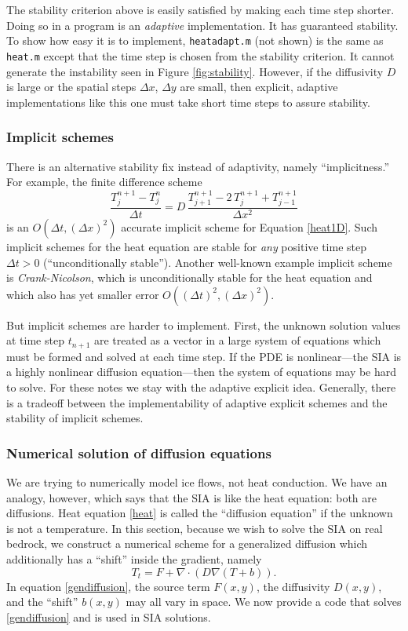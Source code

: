 \documentclass[titlepage,a4paper,final,12pt]{scrartcl}
\newcommand{\grad}{\nabla}
\newcommand{\Div}{\nabla\cdot}
\begin{document}
The stability criterion above is easily satisfied by making each time step shorter.  Doing so in a program is an \emph{adaptive} implementation.  It has guaranteed stability.  To show how easy it is to implement, \texttt{heatadapt.m} (not shown) is the same as \texttt{heat.m} except that the time step is chosen from the stability criterion.  It cannot generate the instability seen in Figure \ref{fig:stability}.  However, if the diffusivity $D$ is large or the spatial steps $\Delta x$, $\Delta y$ are small, then explicit, adaptive implementations like this one must take short time steps to assure stability.


\subsubsection*{Implicit schemes}  There is an alternative stability fix instead of adaptivity, namely ``implicitness.''  For example, the finite difference scheme
\begin{equation}
  \frac{T_j^{n+1} - T_j^n}{\Delta t} = D\,\frac{T_{j+1}^{n+1} - 2\, T_j^{n+1} + T_{j-1}^{n+1}}{\Delta x^2} \label{implicit1D}
\end{equation}
is an $O(\Delta t,(\Delta x)^2)$ accurate implicit scheme for Equation \eqref{heat1D}.  Such implicit schemes for the heat equation are stable for \emph{any} positive time step $\Delta t>0$ (``unconditionally stable'').  Another well-known example implicit scheme is \emph{Crank-Nicolson}, which is unconditionally stable for the heat equation and which also has yet smaller error $O((\Delta t)^2,(\Delta x)^2)$.

But implicit schemes are harder to implement.  First, the unknown solution values at time step $t_{n+1}$ are treated as a vector in a large system of equations which must be formed and solved at each time step.  If the PDE is nonlinear---the SIA is a highly nonlinear diffusion equation---then the system of equations may be hard to solve.  For these notes we stay with the adaptive explicit idea.  Generally, there is a tradeoff between the implementability of adaptive explicit schemes and the stability of implicit schemes.

\subsubsection*{Numerical solution of diffusion equations}  We are trying to numerically model ice flows, not heat conduction.  We have an analogy, however, which says that the SIA is like the heat equation: both are diffusions.  Heat equation \eqref{heat} is called the ``diffusion equation'' if the unknown is not a temperature.  In this section, because we wish to solve the SIA on real bedrock, we construct a numerical scheme for a generalized diffusion which additionally has a ``shift'' inside the gradient, namely
\begin{equation}
  T_t = F + \Div \left(D \grad (T + b)\right). \label{gendiffusion}
\end{equation}
In equation \eqref{gendiffusion}, the source term $F(x,y)$, the diffusivity $D(x,y)$, and the ``shift'' $b(x,y)$ may all vary in space.  We now provide a code that solves \eqref{gendiffusion} and is used in SIA solutions.
\end{document}

